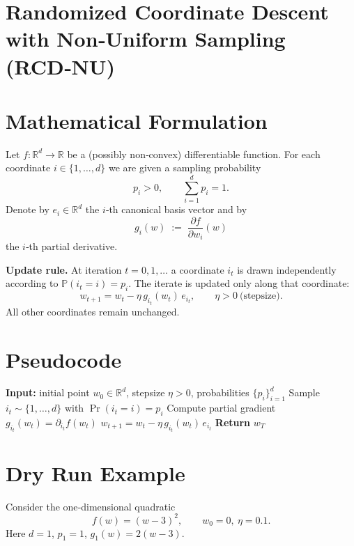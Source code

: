 \documentclass{article}
\newcommand{\RR}{\mathbb{R}}
\begin{document}
\section*{Randomized Coordinate Descent with Non‑Uniform Sampling (RCD‑NU)}

\section*{Mathematical Formulation}
Let $f:\RR^{d}\rightarrow\RR$ be a (possibly non‑convex) differentiable function.
For each coordinate $i\in\{1,\dots ,d\}$ we are given a sampling probability
\[
p_i>0,\qquad \sum_{i=1}^{d}p_i=1 .
\]
Denote by $e_i\in\RR^{d}$ the $i$‑th canonical basis vector and by
\[
g_i(w)\;:=\;\frac{\partial f}{\partial w_i}(w)
\]
the $i$‑th partial derivative.

\noindent\textbf{Update rule.}  
At iteration $t=0,1,\dots$ a coordinate $i_t$ is drawn independently
according to $\mathbb{P}(i_t=i)=p_i$. The iterate is updated only along that
coordinate:
\begin{equation}
\boxed{
w_{t+1}=w_t-\eta\, g_{i_t}(w_t)\,e_{i_t}},
\qquad\eta>0\ \text{(stepsize)} .
\label{eq:update}
\end{equation}
All other coordinates remain unchanged.

\section*{Pseudocode}
\begin{algorithm}[H]
\caption{Randomized Coordinate Descent with non‑uniform probabilities}
\label{alg:rcd}
\begin{algorithmic}[1]
\STATE \textbf{Input:} initial point $w_0\in\RR^{d}$, stepsize $\eta>0$, probabilities $\{p_i\}_{i=1}^{d}$
    \STATE Sample $i_t\sim\{1,\dots ,d\}$ with $\Pr(i_t=i)=p_i$
    \STATE Compute partial gradient $g_{i_t}(w_t)=\partial_{i_t}f(w_t)$
    \STATE $w_{t+1}=w_t-\eta\,g_{i_t}(w_t)\,e_{i_t}$ \hfill{}
\ENDFOR
\STATE \textbf{Return} $w_T$
\end{algorithmic}
\end{algorithm}

\section*{Dry Run Example}
Consider the one‑dimensional quadratic
\[
f(w)=(w-3)^2,\qquad w_0=0,\ \eta=0.1 .
\]
Here $d=1$, $p_1=1$, $g_1(w)=2(w-3)$.
\end{document}
